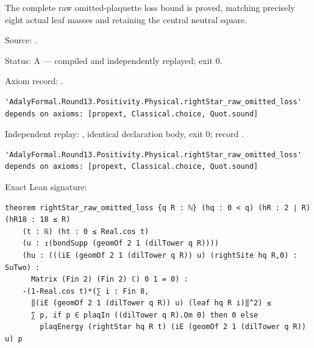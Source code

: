 \begin{theorem}[bp-493]
\label{bp-493}
\leanok
The complete raw omitted-plaquette loss bound is proved, matching precisely eight actual leaf masses and retaining the central neutral square.

\par Source: \texttt{}.
\par Status: A — compiled and independently replayed; exit 0.
\par Axiom record: \texttt{}.
\begin{verbatim}
'AdalyFormal.Round13.Positivity.Physical.rightStar_raw_omitted_loss' depends on axioms: [propext, Classical.choice, Quot.sound]
\end{verbatim}
\par Independent replay: \texttt{}, identical declaration body, exit 0; record \texttt{}.
\begin{verbatim}
'AdalyFormal.Round13.Positivity.Physical.rightStar_raw_omitted_loss' depends on axioms: [propext, Classical.choice, Quot.sound]
\end{verbatim}
\par Exact Lean signature:
\begin{verbatim}
theorem rightStar_raw_omitted_loss {q R : ℕ} (hq : 0 < q) (hR : 2 ∣ R) (hR18 : 18 ≤ R)
    (t : ℝ) (ht : 0 ≤ Real.cos t)
    (u : ↥(bondSupp (geomOf 2 1 (dilTower q R))))
    (hu : (((iE (geomOf 2 1 (dilTower q R)) u) (rightSite hq R,0) : SuTwo) :
      Matrix (Fin 2) (Fin 2) ℂ) 0 1 = 0) :
    -(1-Real.cos t)*(∑ i : Fin 8,
      ‖(iE (geomOf 2 1 (dilTower q R)) u) (leaf hq R i)‖^2) ≤
      ∑ p, if p ∈ plaqIn ((dilTower q R).Om 0) then 0 else
        plaqEnergy (rightStar hq R t) (iE (geomOf 2 1 (dilTower q R)) u) p
\end{verbatim}
\end{theorem}

